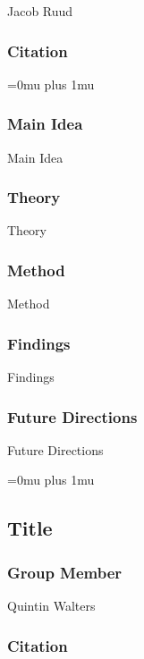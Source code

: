 \noindent
Jacob Ruud
\noindent
\subsubsection{Citation}

\Urlmuskip=0mu plus 1mu\relax

\subsubsection{Main Idea}

\noindent
Main Idea

\subsubsection{Theory}

\noindent
Theory

\subsubsection{Method}

\noindent
Method

\subsubsection{Findings}

\noindent
Findings

\subsubsection{Future Directions}

\noindent
Future Directions 

\Urlmuskip=0mu plus 1mu\relax

\noindent
\subsection{Title}

\subsubsection{Group Member}

\noindent
Quintin Walters

\noindent
\subsubsection{Citation}

